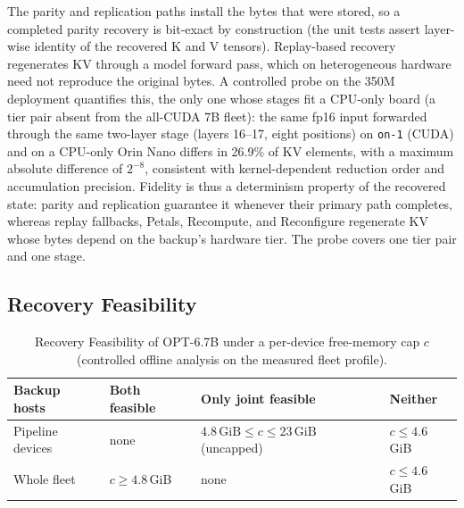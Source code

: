The parity and replication paths install the bytes that were stored, so a
completed parity recovery is bit-exact by construction (the unit tests assert
layer-wise identity of the recovered K and V tensors).  Replay-based recovery
regenerates KV through a model forward pass, which on heterogeneous hardware
need not reproduce the original bytes.  A controlled probe on the 350M deployment quantifies this, the only one whose stages fit a
CPU-only board (a tier pair absent from the all-CUDA 7B fleet): the same fp16 input forwarded through the same two-layer
stage (layers 16--17, eight positions) on \texttt{on-1} (CUDA) and on a
CPU-only Orin Nano differs in 26.9\% of KV elements, with a maximum absolute
difference of $2^{-8}$, consistent with kernel-dependent reduction order and
accumulation precision.  Fidelity is thus a determinism property of the
recovered state: parity and replication guarantee it whenever their primary
path completes, whereas replay fallbacks, Petals, Recompute, and Reconfigure
regenerate KV whose bytes depend on the backup's hardware tier.  The probe
covers one tier pair and one stage.

\subsection{Recovery Feasibility}\label{sec:eval:feasibility}

\begin{table}[t]
  \centering
  \scriptsize
  \setlength{\tabcolsep}{3.5pt}
  \caption{Recovery Feasibility of OPT-6.7B under a per-device free-memory
  cap $c$ (controlled offline analysis on the measured fleet profile).}
  \label{tab:feasibility}
  \begin{tabular}{l l l l}
    \toprule
    Backup hosts & Both feasible & Only joint feasible & Neither \\
    \midrule
    Pipeline devices & none & $4.8\,\mathrm{GiB}\leq c\leq 23\,\mathrm{GiB}$ (uncapped) & $c\leq4.6$\,GiB \\
    Whole fleet & $c\geq4.8$\,GiB & none & $c\leq4.6$\,GiB \\
    \bottomrule
  \end{tabular}
\end{table}

